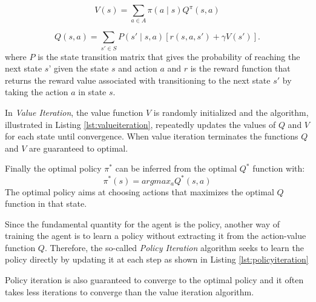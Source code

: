 \begin{equation}
  \label{eq:statevaluefromQ}
  V(s) = \sum_{a\in A} \pi(a \mid s) Q^{\pi} (s,a)
\end{equation}

\begin{equation}
  \label{eq:actionstatevaluefromV}
  Q(s,a) = \sum_{s'\in S} P(s' \mid s,a) [r(s,a,s') + \gamma V (s')].
\end{equation}
where $P$ is the state transition matrix that gives the probability of reaching the next state $s\textit{'}$ given the state $s$ and action $a$ and $r$ is the reward function that returns the reward value associated with transitioning to the next state $s'$ by taking the action $a$ in state $s$.

In \textit{Value Iteration}, the value function $V$ is randomly initialized and the algorithm, illustrated in Listing \ref{lst:valueiteration}, repeatedly updates the values of $Q$ and $V$ for each state until convergence. When value iteration terminates the functions $Q$ and $V$ are guaranteed to optimal.

\begin{center}
  \begin{minipage}{0.65\linewidth}
    
    \end{minipage}
\end{center}
Finally the optimal policy $\pi^{*}$ can be inferred from the optimal $Q^{*}$ function with:
\begin{equation}
  \label{eq:pifromq}
  \pi^{*}(s) = argmax_a Q^{*}(s,a)
\end{equation}
The optimal policy aims at choosing actions that maximizes the optimal $Q$ function in that state.

Since the fundamental quantity for the agent is the policy, another way of training the agent is to learn a policy without extracting it from the action-value function $Q$. Therefore, the so-called \textit{Policy Iteration} algorithm seeks to learn the policy directly by updating it at each step as shown in Listing \ref{lst:policyiteration}
\begin{center}
  \begin{minipage}{0.65\linewidth}
    
    \end{minipage}
\end{center}
Policy iteration is also guaranteed to converge to the optimal policy and it often takes less iterations to converge than the value iteration algorithm.


